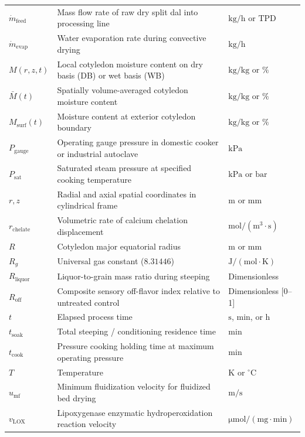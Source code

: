 \documentclass[10pt,a4paper]{article}
\begin{document}
\begin{longtable}{p{2.5cm}p{10.2cm}p{3.0cm}}
$\dot{m}_{\mathrm{feed}}$ & Mass flow rate of raw dry split dal into processing line & $\mathrm{kg/h}$ or $\mathrm{TPD}$ \\
$\dot{m}_{\mathrm{evap}}$ & Water evaporation rate during convective drying & $\mathrm{kg/h}$ \\
$M(r, z, t)$ & Local cotyledon moisture content on dry basis (DB) or wet basis (WB) & $\mathrm{kg/kg}$ or $\%$ \\
$\bar{M}(t)$ & Spatially volume-averaged cotyledon moisture content & $\mathrm{kg/kg}$ or $\%$ \\
$M_{\mathrm{surf}}(t)$ & Moisture content at exterior cotyledon boundary & $\mathrm{kg/kg}$ or $\%$ \\
$P_{\mathrm{gauge}}$ & Operating gauge pressure in domestic cooker or industrial autoclave & $\mathrm{kPa}$ \\
$P_{\mathrm{sat}}$ & Saturated steam pressure at specified cooking temperature & $\mathrm{kPa}$ or $\mathrm{bar}$ \\
$r, z$ & Radial and axial spatial coordinates in cylindrical frame & $\mathrm{m}$ or $\mathrm{mm}$ \\
$r_{\mathrm{chelate}}$ & Volumetric rate of calcium chelation displacement & $\mathrm{mol/(m^3 \cdot s)}$ \\
$R$ & Cotyledon major equatorial radius & $\mathrm{m}$ or $\mathrm{mm}$ \\
$R_g$ & Universal gas constant ($8.31446$) & $\mathrm{J/(mol \cdot K)}$ \\
$R_{\mathrm{liquor}}$ & Liquor-to-grain mass ratio during steeping & Dimensionless \\
$R_{\mathrm{off}}$ & Composite sensory off-flavor index relative to untreated control & Dimensionless [0--1] \\
$t$ & Elapsed process time & $\mathrm{s}$, $\mathrm{min}$, or $\mathrm{h}$ \\
$t_{\mathrm{soak}}$ & Total steeping / conditioning residence time & $\mathrm{min}$ \\
$t_{\mathrm{cook}}$ & Pressure cooking holding time at maximum operating pressure & $\mathrm{min}$ \\
$T$ & Temperature & $\mathrm{K}$ or $^\circ\mathrm{C}$ \\
$u_{\mathrm{mf}}$ & Minimum fluidization velocity for fluidized bed drying & $\mathrm{m/s}$ \\
$v_{\mathrm{LOX}}$ & Lipoxygenase enzymatic hydroperoxidation reaction velocity & $\mathrm{\mu mol/(mg \cdot min)}$ \\

\end{longtable}
\end{document}
